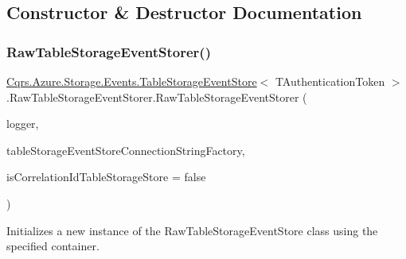 \subsection{Constructor \& Destructor Documentation}
\mbox{\label{classCqrs_1_1Azure_1_1Storage_1_1Events_1_1TableStorageEventStore_1_1RawTableStorageEventStorer_af5ed87f6a4d32ff3581a6d2ae107dcd1_af5ed87f6a4d32ff3581a6d2ae107dcd1}} 
\subsubsection{\texorpdfstring{Raw\+Table\+Storage\+Event\+Storer()}{RawTableStorageEventStorer()}}
{\footnotesize\ttfamily \hyperlink{classCqrs_1_1Azure_1_1Storage_1_1Events_1_1TableStorageEventStore}{Cqrs.\+Azure.\+Storage.\+Events.\+Table\+Storage\+Event\+Store}$<$ T\+Authentication\+Token $>$.Raw\+Table\+Storage\+Event\+Storer.\+Raw\+Table\+Storage\+Event\+Storer (\begin{DoxyParamCaption}\item[{I\+Logger}]{logger,  }\item[{\hyperlink{interfaceCqrs_1_1Azure_1_1BlobStorage_1_1ITableStorageStoreConnectionStringFactory}{I\+Table\+Storage\+Store\+Connection\+String\+Factory}}]{table\+Storage\+Event\+Store\+Connection\+String\+Factory,  }\item[{bool}]{is\+Correlation\+Id\+Table\+Storage\+Store = {\ttfamily false} }\end{DoxyParamCaption})}



Initializes a new instance of the Raw\+Table\+Storage\+Event\+Store class using the specified container. 



